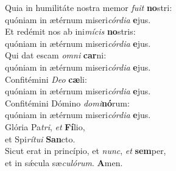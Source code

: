\oddverse Quia in humilitáte nostra memor \textit{fu}\textit{it} \textbf{no}stri:~\*\\
\oddverse quóniam in ætérnum miseri\textit{cór}\textit{di}\textit{a} \textbf{e}jus.\\
\evenverse Et redémit nos ab ini\textit{mí}\textit{cis} \textbf{no}stris:~\*\\
\evenverse quóniam in ætérnum miseri\textit{cór}\textit{di}\textit{a} \textbf{e}jus.\\
\oddverse Qui dat escam \textit{om}\textit{ni} \textbf{car}ni:~\*\\
\oddverse quóniam in ætérnum miseri\textit{cór}\textit{di}\textit{a} \textbf{e}jus.\\
\evenverse Confitémini \textit{De}\textit{o} \textbf{cæ}li:~\*\\
\evenverse quóniam in ætérnum miseri\textit{cór}\textit{di}\textit{a} \textbf{e}jus.\\
\oddverse Confitémini Dómino \textit{do}\textit{mi}\textbf{nó}rum:~\*\\
\oddverse quóniam in ætérnum miseri\textit{cór}\textit{di}\textit{a} \textbf{e}jus.\\
\evenverse Glória Pa\textit{tri}, \textit{et} \textbf{Fí}lio,~\*\\
\evenverse et Spi\textit{rí}\textit{tu}\textit{i} \textbf{San}cto.\\
\oddverse Sicut erat in princípio, et \textit{nunc}, \textit{et} \textbf{sem}per,~\*\\
\oddverse et in sǽcula sæ\textit{cu}\textit{ló}\textit{rum}. \textbf{A}men.\\
